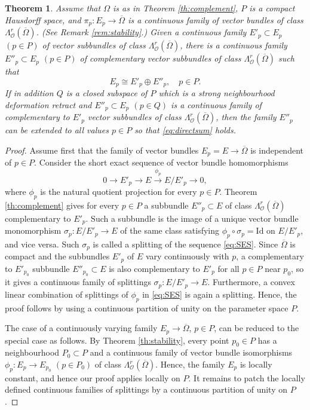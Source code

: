 \documentclass[11pt]{amsart}
\numberwithin{equation}{section}
\newtheorem{theorem}{Theorem}[section]
\theoremstyle{definition}
\newcommand\Oscr{\mathscr{O}}
\newcommand\lra{\longrightarrow}
\newcommand\Id{\mathrm{Id}}
\begin{document}
\begin{theorem}\label{th:complement-par}
Assume that $\Omega$ is as in Theorem \ref{th:complement}, 
$P$ is a compact Hausdorff space, and 
$\pi_p:E_p\to \overline\Omega$ is a continuous family 
of vector bundles of class $\Lambda^r_\Oscr(\overline\Omega)$.
(See Remark \ref{rem:stability}.) 
Given a continuous family $E'_p\subset E_p$ $(p\in P)$ 
of  vector subbundles of class $\Lambda^r_\Oscr(\overline\Omega)$, 
there is a continuous family $E''_p\subset E_p$ $(p\in P)$ 
of complementary vector subbundles of class 
$\Lambda^r_\Oscr(\overline\Omega)$ such that 
\begin{equation}\label{eq:directsum} 
	E_p\cong E'_p\oplus E''_p,\quad p\in P.
\end{equation}
If in addition $Q$ is a closed subspace of $P$ which is a 
strong neighbourhood deformation retract and 
$E''_p\subset E_p$ $(p\in Q)$ is a continuous family 
of complementary to $E'_p$  vector subbundles of class 
$\Lambda^r_\Oscr(\overline\Omega)$, then the family $E''_p$
can be extended to all values $p\in P$ so that 
\eqref{eq:directsum} holds.
\end{theorem}

\begin{proof}
Assume first that the family of vector bundles 
$E_p=E\to \overline \Omega$ is independent of $p\in P$.
Consider the short exact sequence of vector bundle homomorphisms 
\begin{equation}\label{eq:SES}	
	0\lra E'_p \lra E \stackrel{\phi_p}{\lra} E/E'_p \lra 0,
\end{equation}
where $\phi_p$ is the natural quotient projection for every $p\in P$. 
Theorem \ref{th:complement} gives for every $p\in P$ a 
subbundle $E''_p\subset E$ of class $\Lambda^r_\Oscr(\overline\Omega)$
complementary to $E'_p$. Such a subbundle is the image of a 
unique vector bundle monomorphism 
$\sigma_p: E/E'_p\to E$ of the same class 
satisfying $\phi_p\circ \sigma_p=\Id$ on $E/E'_p$, and vice versa.
Such $\sigma_p$ is called a splitting of the sequence \eqref{eq:SES}.
Since $\overline \Omega$ is compact and the subbundles
$E'_p$ of $E$ vary continuously with $p$, a complementary 
to $E'_{p_0}$ subbundle $E''_{p_0}\subset E$ 
is also complementary to $E'_p$ for all $p\in P$  
near $p_0$, so it gives a continuous family of
splittings $\sigma_p:E/E'_p\to E$. Furthermore, a convex linear 
combination of splittings of $\phi_p$ in \eqref{eq:SES} 
is again a splitting. Hence, the proof follows by using a continuous
partition of unity on the parameter space $P$.

The case of a continuously varying family $E_p\to \overline \Omega$, 
$p\in P$, can be reduced to the special case as follows. 
By Theorem \ref{th:stability}, every point $p_0\in P$ has a neighbourhood
$P_0\subset P$ and a continuous family of vector bundle isomorphisms 
$\phi_p:E_p\to E_{p_0}$ $(p\in P_0)$ of class 
$\Lambda^r_\Oscr(\overline\Omega)$.
Hence, the family $E_p$ is locally constant, and hence 
our proof applies locally on $P$. It remains to patch 
the locally defined continuous families of 
splittings by a continuous partition of unity on $P$. 
\end{proof}
\end{document}
